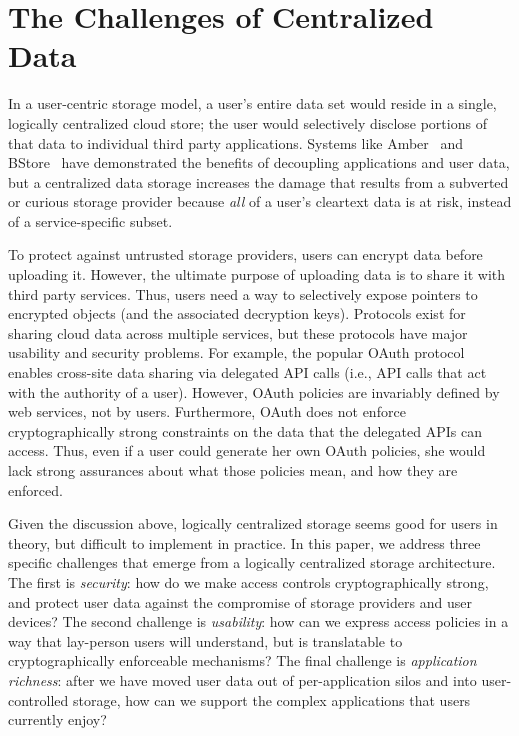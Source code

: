\section{The Challenges of Centralized Data}

In a user-centric storage model, a user's
entire data set would reside in a single,
logically centralized cloud store; the user
would selectively disclose portions of that
data to individual third party applications.
Systems like Amber~\cite{amber} and BStore~\cite{bstore}
have demonstrated the benefits of 
decoupling applications and user
data, but a centralized data storage
increases the damage that results from a
subverted or curious storage provider because
\emph{all} of a user's cleartext data is at
risk, instead of a service-specific subset.

To protect against untrusted storage providers,
users can encrypt data before uploading it.
However, the ultimate purpose of uploading
data is to share it with third party services.
Thus, users need a way to selectively expose
pointers to encrypted objects (and the associated
decryption keys). Protocols exist for sharing
cloud data across multiple services, but these
protocols have major usability and security
problems. For example, the popular OAuth
protocol~\cite{oauth} enables cross-site data
sharing via delegated API calls (i.e., API
calls that act with the authority of a user).
However, OAuth policies are invariably defined
by web services, not by users. Furthermore,
OAuth does not enforce cryptographically strong
constraints on the data that the delegated
APIs can access. Thus, even if a user could
generate her own OAuth policies, she would
lack strong assurances about what those policies
mean, and how they are enforced.

Given the discussion above, logically centralized
storage seems good for users in theory, but
difficult to implement in practice. In this
paper, we address three specific challenges
that emerge from a logically centralized storage
architecture. The first is \emph{security}: how
do we make access controls cryptographically
strong, and protect user data against the
compromise of storage providers and user devices?
The second challenge is \emph{usability}: how
can we express access policies in a way that
lay-person users will understand, but is
translatable to cryptographically enforceable
mechanisms? The final challenge is \emph{application
richness}: after we have moved user data out
of per-application silos and into user-controlled
storage, how can we support the complex 
applications that users currently enjoy?

